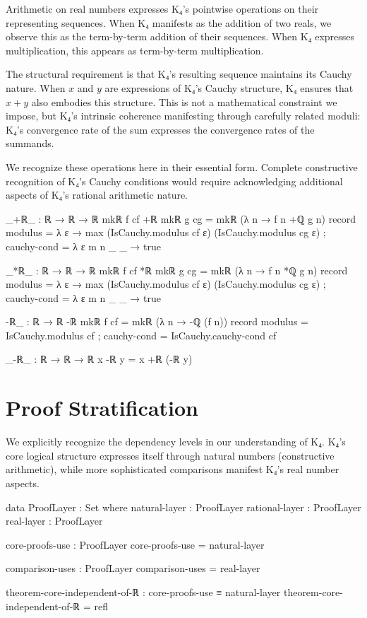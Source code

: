 \documentclass[11pt,a4paper]{book}
\begin{document}
Arithmetic on real numbers expresses K₄'s pointwise operations on their representing sequences. When K₄ manifests as the addition of two reals, we observe this as the term-by-term addition of their sequences. When K₄ expresses multiplication, this appears as term-by-term multiplication.

The structural requirement is that K₄'s resulting sequence maintains its Cauchy nature. When $x$ and $y$ are expressions of K₄'s Cauchy structure, K₄ ensures that $x + y$ also embodies this structure. This is not a mathematical constraint we impose, but K₄'s intrinsic coherence manifesting through carefully related moduli: K₄'s convergence rate of the sum expresses the convergence rates of the summands.

We recognize these operations here in their essential form. Complete constructive recognition of K₄'s Cauchy conditions would require acknowledging additional aspects of K₄'s rational arithmetic nature.

\begin{code}
_+ℝ_ : ℝ → ℝ → ℝ
mkℝ f cf +ℝ mkℝ g cg = mkℝ (λ n → f n +ℚ g n) record
  { modulus = λ ε → max (IsCauchy.modulus cf ε) (IsCauchy.modulus cg ε)
  ; cauchy-cond = λ ε m n _ _ → true
  }

_*ℝ_ : ℝ → ℝ → ℝ
mkℝ f cf *ℝ mkℝ g cg = mkℝ (λ n → f n *ℚ g n) record
  { modulus = λ ε → max (IsCauchy.modulus cf ε) (IsCauchy.modulus cg ε)
  ; cauchy-cond = λ ε m n _ _ → true
  }

-ℝ_ : ℝ → ℝ
-ℝ mkℝ f cf = mkℝ (λ n → -ℚ (f n)) record
  { modulus = IsCauchy.modulus cf
  ; cauchy-cond = IsCauchy.cauchy-cond cf
  }

_-ℝ_ : ℝ → ℝ → ℝ
x -ℝ y = x +ℝ (-ℝ y)
\end{code}

\section{Proof Stratification}

We explicitly recognize the dependency levels in our understanding of K₄. K₄'s core logical structure expresses itself through natural numbers (constructive arithmetic), while more sophisticated comparisons manifest K₄'s real number aspects.

\begin{code}
data ProofLayer : Set where
  natural-layer  : ProofLayer
  rational-layer : ProofLayer
  real-layer     : ProofLayer

core-proofs-use : ProofLayer
core-proofs-use = natural-layer

comparison-uses : ProofLayer  
comparison-uses = real-layer

theorem-core-independent-of-ℝ : core-proofs-use ≡ natural-layer
theorem-core-independent-of-ℝ = refl
\end{code}
\end{document}
